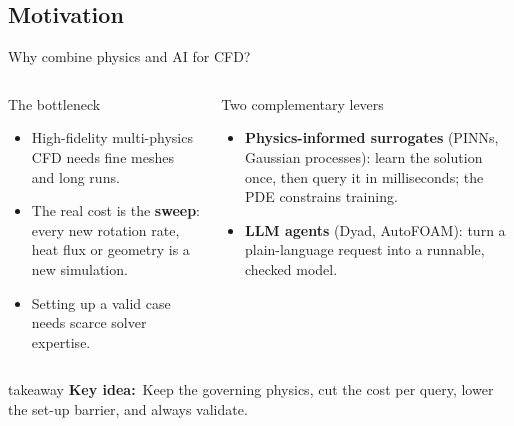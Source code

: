 \documentclass[aspectratio=169,10pt,t]{beamer}
\newcommand{\key}[1]{\textcolor{qblue}{\textbf{#1}}}
\newcommand{\takeaway}[1]{%
  \par\vfill
  \begin{beamercolorbox}[wd=\linewidth,sep=5pt,rounded=true]{takeaway}
    \small\textcolor{qblue}{\textbf{Key idea:}}~#1
  \end{beamercolorbox}\vspace{1mm}}
\begin{document}
\begin{frame}
\section{Motivation}
\begin{frame}{Why combine physics and AI for CFD?}
\begin{columns}[T,onlytextwidth]
\begin{block}{The bottleneck}
\begin{itemize}\small
  \item High-fidelity multi-physics CFD needs fine meshes and long runs.
  \item The real cost is the \key{sweep}: every new rotation rate, heat flux or geometry is a new simulation.
  \item Setting up a valid case needs scarce solver expertise.
\end{itemize}
\end{block}
\begin{block}{Two complementary levers}
\begin{itemize}\small
  \item \key{Physics-informed surrogates} (PINNs, Gaussian processes): learn the solution once, then query it in milliseconds; the PDE constrains training.
  \item \key{LLM agents} (Dyad, AutoFOAM): turn a plain-language request into a runnable, checked model.
\end{itemize}
\end{block}
\end{columns}
\vspace{3mm}
\centering
{}
\takeaway{Keep the governing physics, cut the cost per query, lower the set-up barrier, and always validate.}
\end{frame}


\end{frame}
\end{document}
